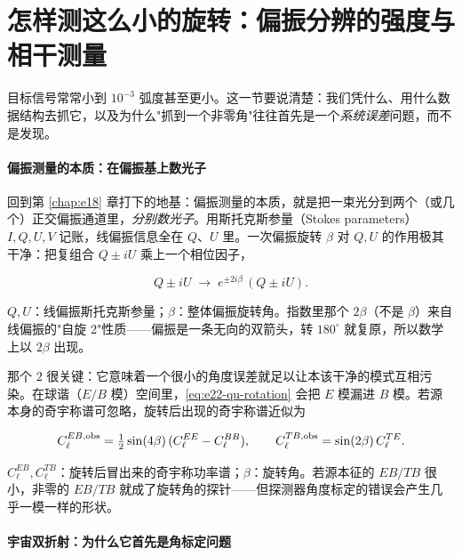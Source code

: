 \section{怎样测这么小的旋转：偏振分辨的强度与相干测量}
\label{sec:e22-measure}

目标信号常常小到 \(10^{-3}\) 弧度甚至更小。这一节要说清楚：我们凭什么、用什么数据结构去抓它，以及为什么"抓到一个非零角"往往首先是一个\emph{系统误差}问题，而不是发现。

\paragraph{偏振测量的本质：在偏振基上数光子}

回到第 \ref{chap:e18} 章打下的地基：偏振测量的本质，就是把一束光分到两个（或几个）正交偏振通道里，\emph{分别数光子}。用斯托克斯参量（Stokes parameters）\(I,Q,U,V\) 记账，线偏振信息全在 \(Q\)、\(U\) 里。一次偏振旋转 \(\beta\) 对 \(Q,U\) 的作用极其干净：把复组合 \(Q\pm iU\) 乘上一个相位因子，

\begin{equation}
  Q\pm iU \;\longrightarrow\; e^{\pm 2i\beta}\,(Q\pm iU).
  \label{eq:e22-qu-rotation}
\end{equation}
\begin{formulaexplain}
\(Q,U\)：线偏振斯托克斯参量；\(\beta\)：整体偏振旋转角。指数里那个 \(2\beta\)（不是 \(\beta\)）来自线偏振的"自旋 2"性质——偏振是一条无向的双箭头，转 \(180^\circ\) 就复原，所以数学上以 \(2\beta\) 出现。
\end{formulaexplain}

那个 \(2\) 很关键：它意味着一个很小的角度误差就足以让本该干净的模式互相污染。在球谐（\(E/B\) 模）空间里，\eqref{eq:e22-qu-rotation} 会把 \(E\) 模漏进 \(B\) 模。若源本身的奇宇称谱可忽略，旋转后出现的奇宇称谱近似为

\begin{equation}
  C_\ell^{EB,\rm obs}=\tfrac12\sin(4\beta)\,(C_\ell^{EE}-C_\ell^{BB}),
  \qquad
  C_\ell^{TB,\rm obs}=\sin(2\beta)\,C_\ell^{TE}.
  \label{eq:e22-eb-tb}
\end{equation}
\begin{formulaexplain}
\(C_\ell^{EB},C_\ell^{TB}\)：旋转后冒出来的奇宇称功率谱；\(\beta\)：旋转角。若源本征的 \(EB/TB\) 很小，非零的 \(EB/TB\) 就成了旋转角的探针——但探测器角度标定的错误会产生几乎一模一样的形状。
\end{formulaexplain}

\paragraph{宇宙双折射：为什么它首先是角标定问题}

